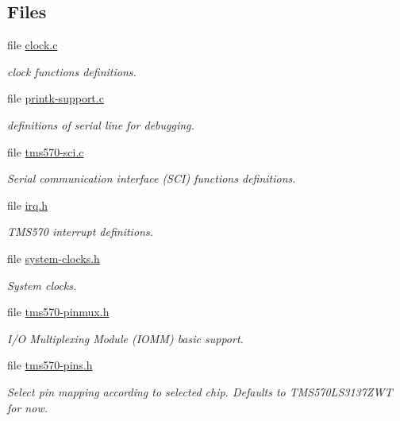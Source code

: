 \subsection*{Files}
\begin{DoxyCompactItemize}
\item 
file \mbox{\hyperlink{bsps_2arm_2tms570_2clock_2clock_8c}{clock.\+c}}
\begin{DoxyCompactList}\small\item\em clock functions definitions. \end{DoxyCompactList}\item 
file \mbox{\hyperlink{printk-support_8c}{printk-\/support.\+c}}
\begin{DoxyCompactList}\small\item\em definitions of serial line for debugging. \end{DoxyCompactList}\item 
file \mbox{\hyperlink{tms570-sci_8c}{tms570-\/sci.\+c}}
\begin{DoxyCompactList}\small\item\em Serial communication interface (S\+CI) functions definitions. \end{DoxyCompactList}\item 
file \mbox{\hyperlink{bsps_2arm_2tms570_2include_2bsp_2irq_8h}{irq.\+h}}
\begin{DoxyCompactList}\small\item\em T\+M\+S570 interrupt definitions. \end{DoxyCompactList}\item 
file \mbox{\hyperlink{tms570_2include_2bsp_2system-clocks_8h}{system-\/clocks.\+h}}
\begin{DoxyCompactList}\small\item\em System clocks. \end{DoxyCompactList}\item 
file \mbox{\hyperlink{tms570-pinmux_8h}{tms570-\/pinmux.\+h}}
\begin{DoxyCompactList}\small\item\em I/O Multiplexing Module (I\+O\+MM) basic support. \end{DoxyCompactList}\item 
file \mbox{\hyperlink{tms570-pins_8h}{tms570-\/pins.\+h}}
\begin{DoxyCompactList}\small\item\em Select pin mapping according to selected chip. Defaults to T\+M\+S570\+L\+S3137\+Z\+WT for now. \end{DoxyCompactList}\item 

\end{DoxyCompactItemize}
